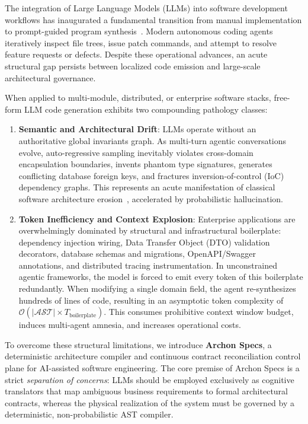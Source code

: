 The integration of Large Language Models (LLMs) into software development workflows has inaugurated a fundamental transition from manual implementation to prompt-guided program synthesis~\cite{li2022competition,roziere2023codellama,fan2023large,hou2024large}. Modern autonomous coding agents~\cite{jimenez2024swebench} iteratively inspect file trees, issue patch commands, and attempt to resolve feature requests or defects. Despite these operational advances, an acute structural gap persists between localized code emission and large-scale architectural governance.

When applied to multi-module, distributed, or enterprise software stacks, free-form LLM code generation exhibits two compounding pathology classes:
\begin{enumerate}[leftmargin=*]
  \item \textbf{Semantic and Architectural Drift}: LLMs operate without an authoritative global invariants graph. As multi-turn agentic conversations evolve, auto-regressive sampling inevitably violates cross-domain encapsulation boundaries, invents phantom type signatures, generates conflicting database foreign keys, and fractures inversion-of-control (IoC) dependency graphs. This represents an acute manifestation of classical software architecture erosion~\cite{perry1992foundations,rosik2011industrial,le2015empirical}, accelerated by probabilistic hallucination.
  \item \textbf{Token Inefficiency and Context Explosion}: Enterprise applications are overwhelmingly dominated by structural and infrastructural boilerplate: dependency injection wiring, Data Transfer Object (DTO) validation decorators, database schemas and migrations, OpenAPI/Swagger annotations, and distributed tracing instrumentation. In unconstrained agentic frameworks, the model is forced to emit every token of this boilerplate redundantly. When modifying a single domain field, the agent re-synthesizes hundreds of lines of code, resulting in an asymptotic token complexity of $\mathcal{O}(|\mathcal{AST}| \times T_{\text{boilerplate}})$. This consumes prohibitive context window budget, induces multi-agent amnesia, and increases operational costs.
\end{enumerate}

To overcome these structural limitations, we introduce \textbf{Archon Specs}, a deterministic architecture compiler and continuous contract reconciliation control plane for AI-assisted software engineering. The core premise of Archon Specs is a strict \emph{separation of concerns}: LLMs should be employed exclusively as cognitive translators that map ambiguous business requirements to formal architectural contracts, whereas the physical realization of the system must be governed by a deterministic, non-probabilistic AST compiler.

